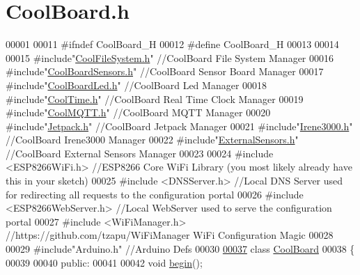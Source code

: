 \hypertarget{_cool_board_8h_source}{}\section{Cool\+Board.\+h}

\begin{DoxyCode}
00001 
00011 \textcolor{preprocessor}{#ifndef CoolBoard\_H}
00012 \textcolor{preprocessor}{#define CoolBoard\_H}
00013 
00014 
00015 \textcolor{preprocessor}{#include"\hyperlink{_cool_file_system_8h}{CoolFileSystem.h}"}  \textcolor{comment}{//CoolBoard File System Manager}
00016 \textcolor{preprocessor}{#include"\hyperlink{_cool_board_sensors_8h}{CoolBoardSensors.h}"}  \textcolor{comment}{//CoolBoard Sensor Board Manager}
00017 \textcolor{preprocessor}{#include"\hyperlink{_cool_board_led_8h}{CoolBoardLed.h}"}  \textcolor{comment}{//CoolBoard Led Manager}
00018 \textcolor{preprocessor}{#include"\hyperlink{_cool_time_8h}{CoolTime.h}"}      \textcolor{comment}{//CoolBoard Real Time Clock Manager}
00019 \textcolor{preprocessor}{#include"\hyperlink{_cool_m_q_t_t_8h}{CoolMQTT.h}"}      \textcolor{comment}{//CoolBoard MQTT Manager}
00020 \textcolor{preprocessor}{#include"\hyperlink{_jetpack_8h}{Jetpack.h}"}        \textcolor{comment}{//CoolBoard Jetpack Manager}
00021 \textcolor{preprocessor}{#include"\hyperlink{_irene3000_8h}{Irene3000.h}"}        \textcolor{comment}{//CoolBoard Irene3000 Manager}
00022 \textcolor{preprocessor}{#include"\hyperlink{_external_sensors_8h}{ExternalSensors.h}"}    \textcolor{comment}{//CoolBoard External Sensors Manager}
00023 
00024 \textcolor{preprocessor}{#include <ESP8266WiFi.h>}    \textcolor{comment}{//ESP8266 Core WiFi Library (you most likely already have this in your sketch)}
00025 \textcolor{preprocessor}{#include <DNSServer.h>}      \textcolor{comment}{//Local DNS Server used for redirecting all requests to the configuration
       portal}
00026 \textcolor{preprocessor}{#include <ESP8266WebServer.h>}   \textcolor{comment}{//Local WebServer used to serve the configuration portal}
00027 \textcolor{preprocessor}{#include <WiFiManager.h>}    \textcolor{comment}{//https://github.com/tzapu/WiFiManager WiFi Configuration Magic}
00028 
00029 \textcolor{preprocessor}{#include"Arduino.h"}     \textcolor{comment}{//Arduino Defs}
00030 
\hyperlink{class_cool_board}{00037} \textcolor{keyword}{class }\hyperlink{class_cool_board}{CoolBoard}
00038 \{
00039 
00040 \textcolor{keyword}{public}:
00041 
00042     \textcolor{keywordtype}{void} \hyperlink{class_cool_board_acba7c5aef7268b2c0044bdb54d3b9d76}{begin}(); 

\end{DoxyCode}
